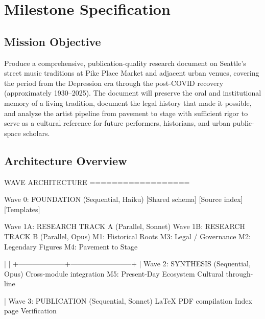 \documentclass[11pt,letterpaper]{article}
\newcommand{\stageheader}[2]{%
  \noindent\colorbox{#2}{\makebox[\textwidth][l]{%
    \textcolor{white}{\bfseries\sffamily\hspace{6pt}#1\hspace{6pt}}}}%
  \vspace{0.5em}\par%
}
\begin{document}
\newpage

\stageheader{STAGE 3 --- MISSION PACKAGE}{tertiary}

\section{Milestone Specification}

\subsection{Mission Objective}

Produce a comprehensive, publication-quality research document on Seattle's street music traditions at Pike Place Market and adjacent urban venues, covering the period from the Depression era through the post-COVID recovery (approximately 1930--2025). The document will preserve the oral and institutional memory of a living tradition, document the legal history that made it possible, and analyze the artist pipeline from pavement to stage with sufficient rigor to serve as a cultural reference for future performers, historians, and urban public-space scholars.

\subsection{Architecture Overview}

\begin{asciibox}
WAVE ARCHITECTURE
==================

Wave 0: FOUNDATION (Sequential, Haiku)
  [Shared schema] [Source index] [Templates]

Wave 1A: RESEARCH TRACK A (Parallel, Sonnet)     Wave 1B: RESEARCH TRACK B (Parallel, Opus)
  M1: Historical Roots                             M3: Legal / Governance
  M2: Legendary Figures                            M4: Pavement to Stage

             |                                              |
             +--------------------+--------------------------+
                                  |
                       Wave 2: SYNTHESIS (Sequential, Opus)
                         Cross-module integration
                         M5: Present-Day Ecosystem
                         Cultural through-line

                                  |
                       Wave 3: PUBLICATION (Sequential, Sonnet)
                         LaTeX PDF compilation
                         Index page
                         Verification
\end{asciibox}
\end{document}
